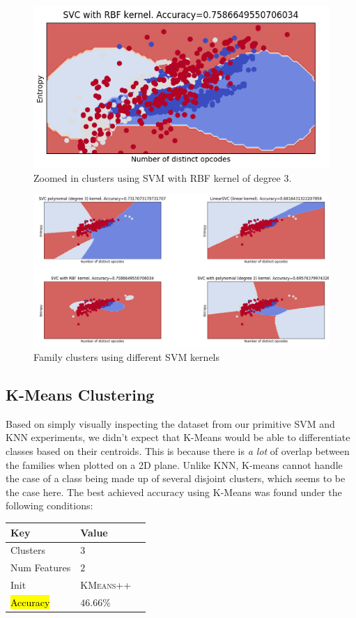 \documentclass[12pt]{article}
\begin{document}
  \begin{figure}[H]
  \centering
  \includegraphics[height=.25\textheight ,width=.5\textwidth]{svmZoom.png}
  \caption{Zoomed in clusters using SVM with RBF kernel of degree 3.}
  \end{figure}
 
  \begin{figure}[H]
  \centering
  \includegraphics[height=.5\textheight ,width=1\textwidth]{svms.png}
  \caption{Family clusters using different SVM kernels}
  \end{figure}
  
\subsection{K-Means Clustering}
  Based on simply visually inspecting the dataset from our primitive SVM and KNN experiments, we didn't expect that K-Means would be able to differentiate classes based on their centroids. This is because there is \textit{a lot} of overlap between the families when plotted on a 2D plane. Unlike KNN, K-means cannot handle the case of a class being made up of several disjoint clusters, which seems to be the case here. The best achieved accuracy using K-Means was found under the following conditions:

  \begin{table}[H]
    \centering
  \begin{tabular}{|l|l|l|}
    \hline \textbf{Key} & \textbf{Value} \\\hline \hline
  Clusters            &        $ 3                    $\\\hline
  Num Features        &        $ 2                   $\\\hline       
  Init        &        \textsc{KMeans++} \\\hline       
  \hl{Accuracy}       &   $ 46.66\%$\\\hline 
  \end{tabular}
  \end{table}  
\end{document}
